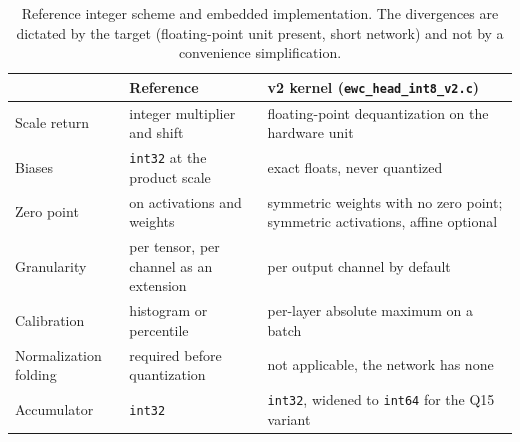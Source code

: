 \begin{table}[htbp]
\centering
\caption{Reference integer scheme and embedded implementation. The divergences are dictated by the
target (floating-point unit present, short network) and not by a convenience simplification.}
\label{tab:quant_ref}
\footnotesize
\begin{tabular}{@{}p{30mm}p{40mm}p{45mm}@{}}
\toprule
 & \textbf{Reference \cite{Jacob2018}} & \textbf{v2 kernel (\texttt{ewc\_head\_int8\_v2.c})} \\
\midrule
Scale return      & integer multiplier and shift & floating-point dequantization on the hardware unit \\
Biases            & \texttt{int32} at the product scale & exact floats, never quantized \\
Zero point        & on activations and weights & symmetric weights with no zero point; symmetric activations, affine optional \\
Granularity       & per tensor, per channel as an extension & per output channel by default \\
Calibration       & histogram or percentile & per-layer absolute maximum on a batch \\
Normalization folding & required before quantization & not applicable, the network has none \\
Accumulator       & \texttt{int32} & \texttt{int32}, widened to \texttt{int64} for the Q15 variant \\
\bottomrule
\end{tabular}
\end{table}

